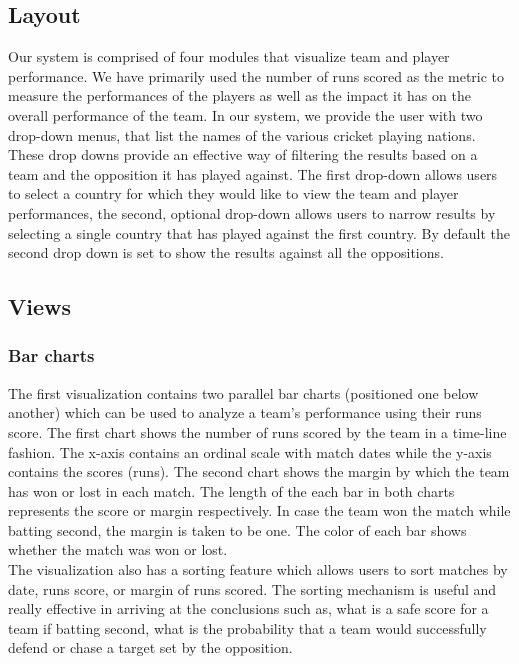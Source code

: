 \documentclass[10pt,journal,compsoc]{IEEEtran}
\begin{document}
\subsection {Layout}
Our system is comprised of four modules that visualize team and player performance. We have primarily used the number of runs scored as the metric to measure the performances of the players as well as the impact it has on the overall performance of the team. In our system, we provide the user with two drop-down menus, that list the names of the various cricket playing nations. These drop downs provide an effective way of filtering the results based on a team and the opposition it has played against. The first drop-down allows users to select a country for which they would like to view the team and player performances, the second, optional drop-down allows users to narrow results by selecting a single country that has played against the first country. By default the second drop down is set to show the results against all the oppositions.


\subsection {Views}

\subsubsection {Bar charts}
The first visualization contains two parallel bar charts (positioned one below another) which can be used to analyze a team’s performance using their runs score. The first chart shows the number of runs scored by the team in a time-line fashion. The x-axis contains an ordinal scale with match dates while the y-axis contains the scores (runs). The second chart shows the margin by which the team has won or lost in each match. The length of the each bar in both charts represents the score or margin respectively. In case the team won the match while batting second, the margin is taken to be one. The color of each bar shows whether the match was won or lost. \\

\indent The visualization also has a sorting feature which allows users to sort matches by date, runs score, or margin of runs scored. The sorting mechanism is useful and really effective in arriving at the conclusions such as, what is a safe score for a team if batting second, what is the probability that a team would successfully defend or chase a target set by the opposition. \\
\end{document}
